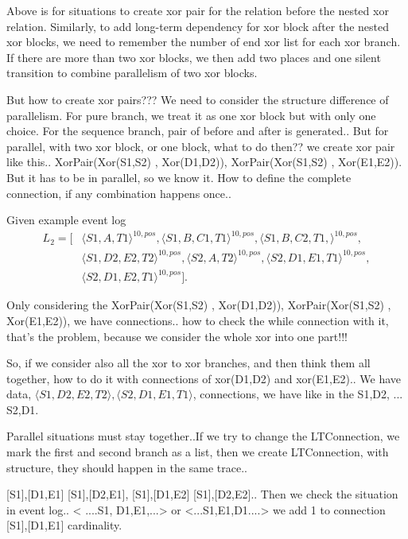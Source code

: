 \documentclass[]{article}
\begin{document}
Above is for situations to create xor pair for the relation before the nested xor relation. Similarly, to add long-term dependency for xor block after the nested xor blocks, we need to remember the number of end xor list for each xor branch. If there are more than two xor blocks, we then add two places and one silent transition to combine parallelism of two xor blocks.

But how to create xor pairs??? We need to consider the structure difference of parallelism. 
For pure branch, we treat it as one xor block but with only one choice. For the sequence branch, pair of before and after is generated.. But for parallel, with two xor block, or one block, what to do then??  
we create xor pair like this.. XorPair(Xor(S1,S2) , Xor(D1,D2)), XorPair(Xor(S1,S2) , Xor(E1,E2)). 
But it has to be in parallel, so we know it. How to define the complete connection, if any combination happens once.. 

Given example event log 
\begin{align*}
 L_2=[ &\langle S1,A,T1 \rangle^{10,pos},  \langle S1,B,C1,T1 \rangle^{10,pos},  \langle S1,B,C2,T1, \rangle^{10,pos}, \\ 
  &\langle S1,D2,E2,T2 \rangle^{10,pos},  \langle S2,A,T2 \rangle^{10,pos}, \langle S2,D1,E1,T1 \rangle^{10,pos},\\
  &\langle S2,D1,E2,T1 \rangle^{10,pos}  ].
\end{align*}

Only considering the XorPair(Xor(S1,S2) , Xor(D1,D2)), XorPair(Xor(S1,S2) , Xor(E1,E2)), we have connections.. how to check the while connection with it, that's the problem, because we consider the whole xor into one part!!! 

So, if we consider also all the xor to xor branches, and then think them all together, how to do it with connections of xor(D1,D2) and xor(E1,E2).. We have data, $\langle S1,D2,E2,T2 \rangle, \langle S2,D1,E1,T1 \rangle $, connections, we have like in the S1,D2, ... S2,D1. 

Parallel situations must stay together..If we try to change the LTConnection, we mark the first and second branch as a list, then we create LTConnection, with structure, they should happen in the same trace.. 

{[S1],[D1,E1]} {[S1],[D2,E1]}, {[S1],[D1,E2]} {[S1],[D2,E2]}.. Then we check the situation in event log.. 
< ....S1, D1,E1,...> or <...S1,E1,D1....> we add 1 to connection {[S1],[D1,E1]} cardinality. 
\end{document}
